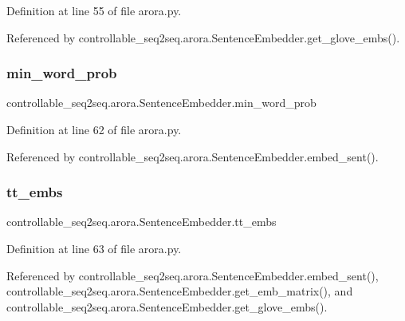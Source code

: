 Definition at line 55 of file arora.\+py.



Referenced by controllable\+\_\+seq2seq.\+arora.\+Sentence\+Embedder.\+get\+\_\+glove\+\_\+embs().

\mbox{\label{classcontrollable__seq2seq_1_1arora_1_1SentenceEmbedder_a83888db228adcc79f5724ed5b6985306}} 
\subsubsection{\texorpdfstring{min\+\_\+word\+\_\+prob}{min\_word\_prob}}
{\footnotesize\ttfamily controllable\+\_\+seq2seq.\+arora.\+Sentence\+Embedder.\+min\+\_\+word\+\_\+prob}



Definition at line 62 of file arora.\+py.



Referenced by controllable\+\_\+seq2seq.\+arora.\+Sentence\+Embedder.\+embed\+\_\+sent().

\mbox{\label{classcontrollable__seq2seq_1_1arora_1_1SentenceEmbedder_a3abeb62adc1f7726978b17b6068cc65c}} 
\subsubsection{\texorpdfstring{tt\+\_\+embs}{tt\_embs}}
{\footnotesize\ttfamily controllable\+\_\+seq2seq.\+arora.\+Sentence\+Embedder.\+tt\+\_\+embs}



Definition at line 63 of file arora.\+py.



Referenced by controllable\+\_\+seq2seq.\+arora.\+Sentence\+Embedder.\+embed\+\_\+sent(), controllable\+\_\+seq2seq.\+arora.\+Sentence\+Embedder.\+get\+\_\+emb\+\_\+matrix(), and controllable\+\_\+seq2seq.\+arora.\+Sentence\+Embedder.\+get\+\_\+glove\+\_\+embs().

